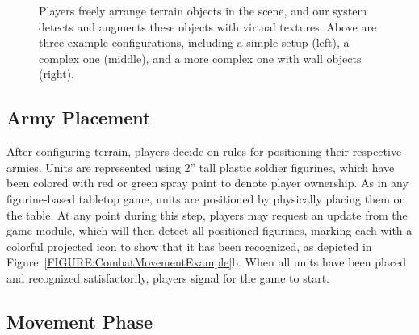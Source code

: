 \documentclass{thesis}
\begin{document}
\begin{figure}[t]
\begin{center}
\end{center}
\vspace{-0.1in}
\caption[Terrain Placement]{Players freely arrange terrain objects in the scene, and our system detects and augments these objects with virtual textures. Above are three example configurations, including a simple setup (left), a complex one (middle), and a more complex one with wall objects (right). }
\label{FIGURE:TerrainPlacement}
\end{figure}

\subsection{Army Placement}

After configuring terrain, players decide on rules for positioning their respective armies. Units are represented using 2'' tall plastic soldier figurines, which have been colored with red or green spray paint to denote player ownership. As in any figurine-based tabletop game, units are positioned by physically placing them on the table. At any point during this step, players may request an update from the game module, which will then detect all positioned figurines, marking each with a colorful projected icon to show that it has been recognized, as depicted in Figure~\ref{FIGURE:CombatMovementExample}b. When all units have been placed and recognized satisfactorily, players signal for the game to start.

\subsection{Movement Phase}
\end{document}
